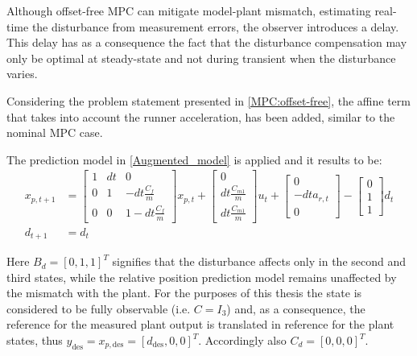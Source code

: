 \documentclass[a4paper,12pt,oneside]{book}
\begin{document}
Although offset-free MPC can mitigate model-plant mismatch, estimating real-time the disturbance from measurement errors, the observer introduces a delay. 
This delay has as a consequence the fact that the disturbance compensation may only be optimal at steady-state and not during transient when the disturbance varies.

\bigskip
Considering the problem statement presented in \ref{MPC:offset-free}, the affine term that takes into account the runner acceleration, has been added, similar to the nominal MPC case.

The prediction model in \ref{Augmented_model} is applied and it results to be:
\begin{equation}
\begin{aligned}
	x_{p,t+1} & =
    \begin{bmatrix}
        1 & dt & 0 \\
        0 & 1 & -dt\frac{C_f}{m} \\
        0 & 0 & 1-dt\frac{C_f}{m}
    \end{bmatrix}
    x_{p,t}
    +
    \begin{bmatrix}
        0 \\
        dt \frac{C_{m1}}{m} \\
        dt \frac{C_{m1}}{m}
    \end{bmatrix}
    u_t + 
    \begin{bmatrix}
    0 \\
    - dt a_{r,t} \\
    0
    \end{bmatrix} 
    -
    \begin{bmatrix}
    0 \\
    1 \\
    1
    \end{bmatrix}
	d_t \\
    d_{t+1} & = d_t
\end{aligned}
\label{Offset-free_prediction_model_MPC}
\end{equation}

Here $B_d = [0, 1, 1]^T$ signifies that the disturbance affects only in the second and third states, while the relative position prediction model remains unaffected by the mismatch with the plant.
For the purposes of this thesis the state is considered to be fully observable (i.e. $C = I_3$) and, as a consequence, the reference for the measured plant output is translated in reference for the plant states, thus $y_{\text{des}} = x_{p,\text{des}} = [d_{\text{des}}, 0, 0] ^T$.
Accordingly also $C_d = [0, 0, 0]^T$. 
\end{document}
